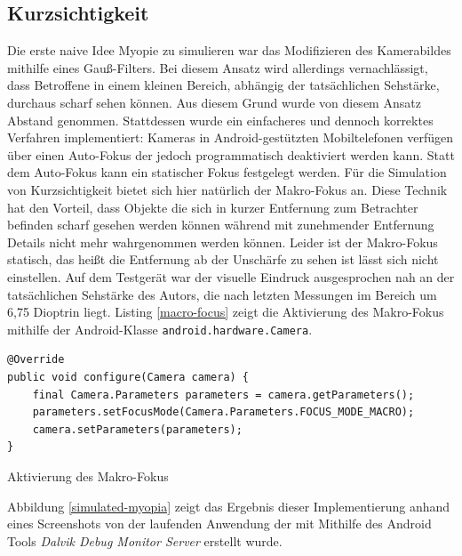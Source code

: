 \documentclass[a4paper]{article}
\begin{document}
\subsection*{Kurzsichtigkeit}
Die erste naive Idee Myopie zu simulieren war das Modifizieren des Kamerabildes mithilfe eines Gauß-Filters. Bei diesem Ansatz wird allerdings vernachlässigt, dass Betroffene in einem kleinen Bereich, abhängig der tatsächlichen Sehstärke, durchaus scharf sehen können. Aus diesem Grund wurde von diesem Ansatz Abstand genommen. Stattdessen wurde ein einfacheres und dennoch korrektes Verfahren implementiert: Kameras in Android-gestützten Mobiltelefonen verfügen über einen Auto-Fokus der jedoch programmatisch deaktiviert werden kann. Statt dem Auto-Fokus kann ein statischer Fokus festgelegt werden. Für die Simulation von Kurzsichtigkeit bietet sich hier natürlich der Makro-Fokus an. Diese Technik hat den Vorteil, dass Objekte die sich in kurzer Entfernung zum Betrachter befinden scharf gesehen werden können während mit zunehmender Entfernung Details nicht mehr wahrgenommen werden können. Leider ist der Makro-Fokus statisch, das heißt die Entfernung ab der Unschärfe zu sehen ist lässt sich nicht einstellen. Auf dem Testgerät war der visuelle Eindruck ausgesprochen nah an der tatsächlichen Sehstärke des Autors, die nach letzten Messungen im Bereich um 6,75 Dioptrin liegt. Listing \ref{macro-focus} zeigt die Aktivierung des Makro-Fokus mithilfe der Android-Klasse \texttt{android.hardware.Camera}.

\begin{listing}[H]
\begin{verbatim}
@Override
public void configure(Camera camera) {
    final Camera.Parameters parameters = camera.getParameters();
    parameters.setFocusMode(Camera.Parameters.FOCUS_MODE_MACRO);
    camera.setParameters(parameters);
}
\end{verbatim}
\caption{Aktivierung des Makro-Fokus}
\label{macro-focus}
\end{listing}

Abbildung \ref{simulated-myopia} zeigt das Ergebnis dieser Implementierung anhand eines Screenshots von der laufenden Anwendung der mit Mithilfe des Android Tools \textit{Dalvik Debug Monitor Server} erstellt wurde.
\end{document}
